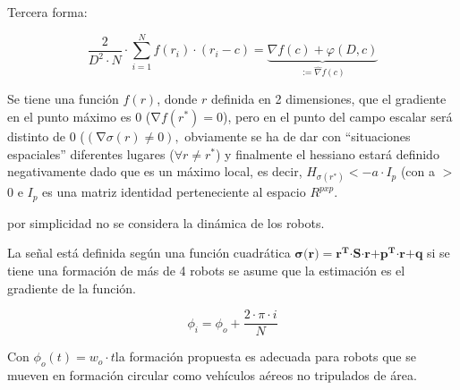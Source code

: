 Tercera forma:

\begin{equation*}
	\frac{2}{{D}^2\cdot{N}}\cdot\sum_{i=1}^{N}f(r_{i})\cdot(r_{i}-c)=\underbrace{\nabla{f}\left(c\right) + \varphi\left(D,c\right)}_{:=\hat{\nabla}{f}\left(c\right)}
\end{equation*}






Se tiene una función $f\left(r\right)$, donde $r$ definida en 2 dimensiones, que el gradiente en el punto máximo es 0 ($\mathrm{\nabla }f\left(r^*\right)=0$), pero en el punto del campo escalar será distinto de 0 ($\left(\mathrm{\nabla }\sigma \left(r\right)\neq 0\right),$ obviamente se ha de dar con ``situaciones espaciales'' diferentes lugares ($\forall r\neq r^*$) y finalmente el hessiano estará definido negativamente dado que es un máximo local, es decir, $H_{\sigma (r^*)}<-a\cdot{I}_{p}$ (con a $\mathrm{>}$ 0 e $I_p$ es una matriz identidad perteneciente al espacio $R^{pxp}$.




por simplicidad no se considera la dinámica de los robots.








\noindent La señal está definida según una función cuadrática $\boldsymbol{\sigma }\boldsymbol{(}\boldsymbol{r}\boldsymbol{)=}{\boldsymbol{r}}^{\boldsymbol{T}}\boldsymbol{\cdot}\boldsymbol{S}\boldsymbol{\cdot}\boldsymbol{r}\boldsymbol{+}{\boldsymbol{p}}^{\boldsymbol{T}}\boldsymbol{\cdot}\boldsymbol{r}\boldsymbol{+}\boldsymbol{q}$ si se tiene una formación de más de 4 robots se asume que la estimación es el gradiente de la función.

\noindent 
\[{\phi }_i={\phi }_{o}+\frac{2\cdot\pi \cdot{i}}{N} \] 

Con ${\phi }_{o}\left(t\right)=w_{o}\cdot{t}$la formación propuesta es adecuada para robots que se mueven en formación circular como vehículos aéreos no tripulados de área.
